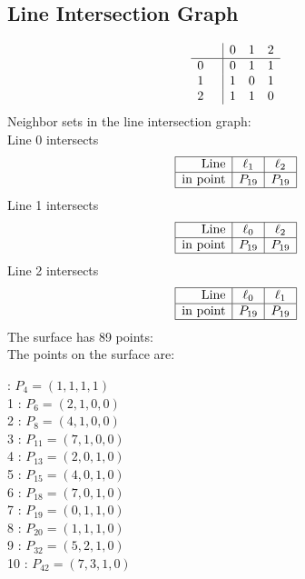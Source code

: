 \documentclass{article}
\begin{document}
{\subsection*{Line Intersection Graph}
{\arraycolsep=1pt
$$
\begin{array}{rr|*{3}r}
 &  & 0 & 1 & 2\\
\hline
0 &  & 0 & 1 & 1\\
1 &  & 1 & 0 & 1\\
2 &  & 1 & 1 & 0\\
\end{array}
$$
}%
Neighbor sets in the line intersection graph:\\
Line 0 intersects 
$$
\begin{array}{|r*{2}{|c}|}
\hline
\mbox{Line}  & \ell_{1} & \ell_{2}\\
\hline
\mbox{in point}  & P_{19} & P_{19}\\
\hline
\end{array}
$$
Line 1 intersects 
$$
\begin{array}{|r*{2}{|c}|}
\hline
\mbox{Line}  & \ell_{0} & \ell_{2}\\
\hline
\mbox{in point}  & P_{19} & P_{19}\\
\hline
\end{array}
$$
Line 2 intersects 
$$
\begin{array}{|r*{2}{|c}|}
\hline
\mbox{Line}  & \ell_{0} & \ell_{1}\\
\hline
\mbox{in point}  & P_{19} & P_{19}\\
\hline
\end{array}
$$
The surface has 89 points:\\
The points on the surface are:\\
\begin{multicols}{3}
 : $P_{4}=( 1, 1, 1, 1 )$\\
1 : $P_{6}=( 2, 1, 0, 0 )$\\
2 : $P_{8}=( 4, 1, 0, 0 )$\\
3 : $P_{11}=( 7, 1, 0, 0 )$\\
4 : $P_{13}=( 2, 0, 1, 0 )$\\
5 : $P_{15}=( 4, 0, 1, 0 )$\\
6 : $P_{18}=( 7, 0, 1, 0 )$\\
7 : $P_{19}=( 0, 1, 1, 0 )$\\
8 : $P_{20}=( 1, 1, 1, 0 )$\\
9 : $P_{32}=( 5, 2, 1, 0 )$\\
10 : $P_{42}=( 7, 3, 1, 0 )$\\

\end{multicols}}
\end{document}
